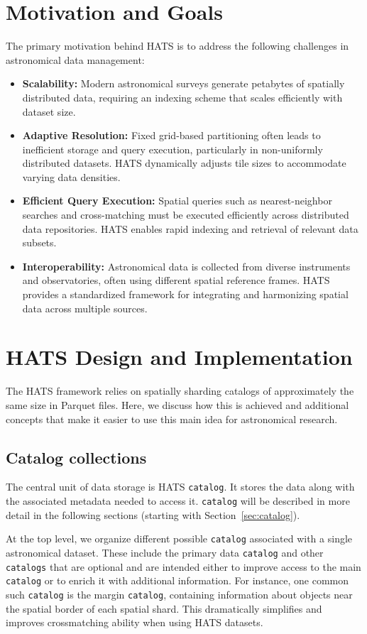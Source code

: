 \documentclass[11pt,a4paper]{ivoa}
\begin{document}
\section{Motivation and Goals}
    The primary motivation behind HATS is to address the following challenges in astronomical data management:
    \begin{itemize}
        \item \textbf{Scalability:} Modern astronomical surveys generate petabytes of spatially distributed data, requiring an indexing scheme that scales efficiently with dataset size.
        \item \textbf{Adaptive Resolution:} Fixed grid-based partitioning often leads to inefficient storage and query execution, particularly in non-uniformly distributed datasets. HATS dynamically adjusts tile sizes to accommodate varying data densities.
        \item \textbf{Efficient Query Execution:} Spatial queries such as nearest-neighbor searches and cross-matching must be executed efficiently across distributed data repositories. HATS enables rapid indexing and retrieval of relevant data subsets.
        \item \textbf{Interoperability:} Astronomical data is collected from diverse instruments and observatories, often using different spatial reference frames. HATS provides a standardized framework for integrating and harmonizing spatial data across multiple sources.
    \end{itemize}

\section{HATS Design and Implementation}
The HATS framework relies on spatially sharding catalogs 
of approximately the same size in Parquet files. Here, we discuss how this is achieved and
additional concepts that make it easier to use this main idea for astronomical
research.
    
\subsection{Catalog collections}
The central unit of data storage is HATS \texttt{catalog}. 
It stores the data along with the associated metadata needed to access it. 
\texttt{catalog} will be described in more detail in the following sections (starting with Section~\ref{sec:catalog}).\par
At the top level, we organize different possible \texttt{catalog} associated with a single astronomical dataset. 
These include the primary data \texttt{catalog} and other \texttt{catalogs} that are optional and are intended either to improve access to the main \texttt{catalog} or to enrich it with additional information. 
For instance, one common such \texttt{catalog} is the margin \texttt{catalog}, containing information about objects near the spatial border of each spatial shard. This dramatically simplifies and improves crossmatching ability when using HATS datasets. \par 
\end{document}
